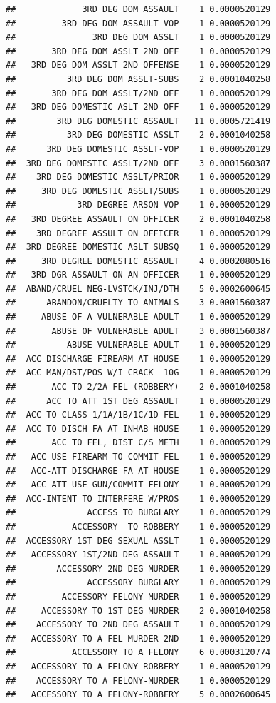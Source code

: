 \documentclass[]{book}
\begin{document}
\begin{verbatim}
##             3RD DEG DOM ASSAULT    1 0.0000520129
##         3RD DEG DOM ASSAULT-VOP    1 0.0000520129
##               3RD DEG DOM ASSLT    1 0.0000520129
##       3RD DEG DOM ASSLT 2ND OFF    1 0.0000520129
##   3RD DEG DOM ASSLT 2ND OFFENSE    1 0.0000520129
##          3RD DEG DOM ASSLT-SUBS    2 0.0001040258
##       3RD DEG DOM ASSLT/2ND OFF    1 0.0000520129
##   3RD DEG DOMESTIC ASLT 2ND OFF    1 0.0000520129
##        3RD DEG DOMESTIC ASSAULT   11 0.0005721419
##          3RD DEG DOMESTIC ASSLT    2 0.0001040258
##      3RD DEG DOMESTIC ASSLT-VOP    1 0.0000520129
##  3RD DEG DOMESTIC ASSLT/2ND OFF    3 0.0001560387
##    3RD DEG DOMESTIC ASSLT/PRIOR    1 0.0000520129
##     3RD DEG DOMESTIC ASSLT/SUBS    1 0.0000520129
##            3RD DEGREE ARSON VOP    1 0.0000520129
##   3RD DEGREE ASSAULT ON OFFICER    2 0.0001040258
##    3RD DEGREE ASSULT ON OFFICER    1 0.0000520129
##  3RD DEGREE DOMESTIC ASLT SUBSQ    1 0.0000520129
##     3RD DEGREE DOMESTIC ASSAULT    4 0.0002080516
##   3RD DGR ASSAULT ON AN OFFICER    1 0.0000520129
##  ABAND/CRUEL NEG-LVSTCK/INJ/DTH    5 0.0002600645
##      ABANDON/CRUELTY TO ANIMALS    3 0.0001560387
##     ABUSE OF A VULNERABLE ADULT    1 0.0000520129
##       ABUSE OF VULNERABLE ADULT    3 0.0001560387
##          ABUSE VULNERABLE ADULT    1 0.0000520129
##  ACC DISCHARGE FIREARM AT HOUSE    1 0.0000520129
##  ACC MAN/DST/POS W/I CRACK -10G    1 0.0000520129
##       ACC TO 2/2A FEL (ROBBERY)    2 0.0001040258
##      ACC TO ATT 1ST DEG ASSAULT    1 0.0000520129
##  ACC TO CLASS 1/1A/1B/1C/1D FEL    1 0.0000520129
##  ACC TO DISCH FA AT INHAB HOUSE    1 0.0000520129
##       ACC TO FEL, DIST C/S METH    1 0.0000520129
##   ACC USE FIREARM TO COMMIT FEL    1 0.0000520129
##   ACC-ATT DISCHARGE FA AT HOUSE    1 0.0000520129
##   ACC-ATT USE GUN/COMMIT FELONY    1 0.0000520129
##  ACC-INTENT TO INTERFERE W/PROS    1 0.0000520129
##              ACCESS TO BURGLARY    1 0.0000520129
##           ACCESSORY  TO ROBBERY    1 0.0000520129
##  ACCESSORY 1ST DEG SEXUAL ASSLT    1 0.0000520129
##   ACCESSORY 1ST/2ND DEG ASSAULT    1 0.0000520129
##        ACCESSORY 2ND DEG MURDER    1 0.0000520129
##              ACCESSORY BURGLARY    1 0.0000520129
##         ACCESSORY FELONY-MURDER    1 0.0000520129
##     ACCESSORY TO 1ST DEG MURDER    2 0.0001040258
##    ACCESSORY TO 2ND DEG ASSAULT    1 0.0000520129
##   ACCESSORY TO A FEL-MURDER 2ND    1 0.0000520129
##           ACCESSORY TO A FELONY    6 0.0003120774
##   ACCESSORY TO A FELONY ROBBERY    1 0.0000520129
##    ACCESSORY TO A FELONY-MURDER    1 0.0000520129
##   ACCESSORY TO A FELONY-ROBBERY    5 0.0002600645

\end{verbatim}
\end{document}
